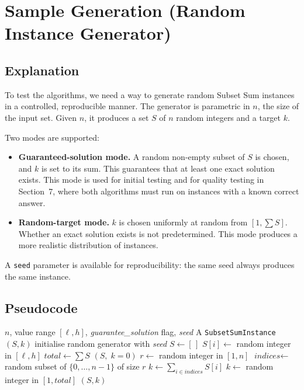 \documentclass[12pt,a4paper]{article}
\theoremstyle{definition}
\begin{document}
\section{Sample Generation (Random Instance Generator)}

\subsection{Explanation}

To test the algorithms, we need a way to generate random Subset Sum instances
in a controlled, reproducible manner. The generator is parametric in $n$, the
size of the input set. Given $n$, it produces a set $S$ of $n$ random integers
and a target $k$.

Two modes are supported:

\begin{itemize}
  \item \textbf{Guaranteed-solution mode.} A random non-empty subset of $S$ is
    chosen, and $k$ is set to its sum. This guarantees that at least one exact
    solution exists. This mode is used for initial testing and for quality
    testing in Section~7, where both algorithms must run on instances with a
    known correct answer.

  \item \textbf{Random-target mode.} $k$ is chosen uniformly at random from
    $[1, \sum S]$. Whether an exact solution exists is not predetermined. This
    mode produces a more realistic distribution of instances.
\end{itemize}

A \texttt{seed} parameter is available for reproducibility: the same seed
always produces the same instance.

\subsection{Pseudocode}

\begin{algorithm}[H]
\caption{Generate Instance}
\label{alg:gen}
\begin{algorithmic}[1]
\Require $n$, value range $[\ell, h]$, \textit{guarantee\_solution} flag, \textit{seed}
\Ensure A \texttt{SubsetSumInstance} $(S, k)$
    \State initialise random generator with \textit{seed}
\EndIf
\State $S \gets [\,]$
    \State $S[i] \gets $ random integer in $[\ell, h]$
\EndFor
\State $\textit{total} \gets \sum S$
    \State \Return $(S,\; k{=}0)$ 
\EndIf
{}
    \State $r \gets $ random integer in $[1, n]$
    \State $\textit{indices} \gets $ random subset of $\{0, \ldots, n{-}1\}$ of size $r$
    \State $k \gets \sum_{i \in \textit{indices}} S[i]$
\Else
    \State $k \gets $ random integer in $[1, \textit{total}]$
\EndIf
\State \Return $(S, k)$
\end{algorithmic}
\end{algorithm}
\end{document}

